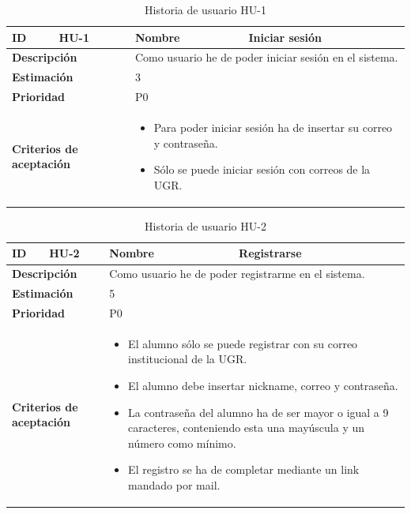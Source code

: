 \begin{table}[H]
    \centering
    \begin{tabular}{|p{2cm}|p{4cm}|p{2cm}|p{4cm}|}
        \hline
        \textbf{ID} & HU-1 & \textbf{Nombre} & Iniciar sesión \\
        \hline
        \multicolumn{2}{|p{6cm}|}{\textbf{Descripción}} & \multicolumn{2}{p{6cm}|}{Como usuario he de poder iniciar sesión en el sistema.} \\
        \hline
        \multicolumn{2}{|p{6cm}|}{\textbf{Estimación}} & \multicolumn{2}{p{6cm}|}{3} \\
        \hline
        \multicolumn{2}{|p{6cm}|}{\textbf{Prioridad}} & \multicolumn{2}{p{6cm}|}{P0} \\
        \hline
        \multicolumn{2}{|p{6cm}|}{\textbf{Criterios de aceptación}} & \multicolumn{2}{p{6cm}|}{
            \begin{itemize}
                \item Para poder iniciar sesión ha de insertar su correo y contraseña.
                \item Sólo se puede iniciar sesión con correos de la UGR.
            \end{itemize}
        } \\
        \hline
    \end{tabular}
    \caption{Historia de usuario HU-1}
    \label{tab:hu_1}
\end{table}

\begin{table}[H]
    \centering
    \begin{tabular}{|p{2cm}|p{4cm}|p{2cm}|p{4cm}|}
        \hline
        \textbf{ID} & HU-2 & \textbf{Nombre} & Registrarse \\
        \hline
        \multicolumn{2}{|p{6cm}|}{\textbf{Descripción}} & \multicolumn{2}{p{6cm}|}{Como usuario he de poder registrarme en el sistema.} \\
        \hline
        \multicolumn{2}{|p{6cm}|}{\textbf{Estimación}} & \multicolumn{2}{p{6cm}|}{5} \\
        \hline
        \multicolumn{2}{|p{6cm}|}{\textbf{Prioridad}} & \multicolumn{2}{p{6cm}|}{P0} \\
        \hline
        \multicolumn{2}{|p{6cm}|}{\textbf{Criterios de aceptación}} & \multicolumn{2}{p{6cm}|}{
            \begin{itemize}
                \item El alumno sólo se puede registrar con su correo institucional de la UGR.
                \item El alumno debe insertar nickname, correo y contraseña.
                \item La contraseña del alumno ha de ser mayor o igual a 9 caracteres, conteniendo esta una mayúscula y un número como mínimo.
                \item El registro se ha de completar mediante un link mandado por mail.
            \end{itemize}
        } \\
        \hline
    \end{tabular}
    \caption{Historia de usuario HU-2}
    \label{tab:hu_2}
\end{table}

